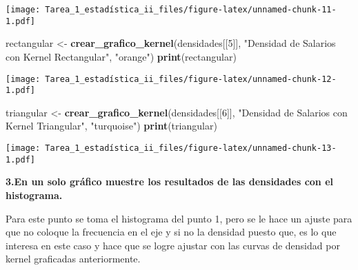 \documentclass[
]{article}
\newenvironment{Shaded}{\begin{snugshade}}{\end{snugshade}}
\newcommand{\DecValTok}[1]{\textcolor[rgb]{0.00,0.00,0.81}{#1}}
\newcommand{\FunctionTok}[1]{\textcolor[rgb]{0.13,0.29,0.53}{\textbf{#1}}}
\newcommand{\NormalTok}[1]{#1}
\newcommand{\OtherTok}[1]{\textcolor[rgb]{0.56,0.35,0.01}{#1}}
\newcommand{\StringTok}[1]{\textcolor[rgb]{0.31,0.60,0.02}{#1}}
\begin{document}
\texttt{[image: Tarea\_1\_estadística\_ii\_files/figure-latex/unnamed-chunk-11-1.pdf]}

\begin{Shaded}
\begin{Highlighting}[]
\NormalTok{rectangular }\OtherTok{\textless{}{-}} \FunctionTok{crear\_grafico\_kernel}\NormalTok{(densidades[[}\DecValTok{5}\NormalTok{]], }
                                    \StringTok{"Densidad de Salarios con Kernel Rectangular"}\NormalTok{, }\StringTok{"orange"}\NormalTok{)}
\FunctionTok{print}\NormalTok{(rectangular)}
\end{Highlighting}
\end{Shaded}

\texttt{[image: Tarea\_1\_estadística\_ii\_files/figure-latex/unnamed-chunk-12-1.pdf]}

\begin{Shaded}
\begin{Highlighting}[]
\NormalTok{triangular }\OtherTok{\textless{}{-}} \FunctionTok{crear\_grafico\_kernel}\NormalTok{(densidades[[}\DecValTok{6}\NormalTok{]], }
                                   \StringTok{"Densidad de Salarios con Kernel Triangular"}\NormalTok{, }\StringTok{"turquoise"}\NormalTok{)}
\FunctionTok{print}\NormalTok{(triangular)}
\end{Highlighting}
\end{Shaded}

\texttt{[image: Tarea\_1\_estadística\_ii\_files/figure-latex/unnamed-chunk-13-1.pdf]}

\textbf{3.En un solo gráfico muestre los resultados de las densidades
con el histograma.}

Para este punto se toma el histograma del punto 1, pero se le hace un
ajuste para que no coloque la frecuencia en el eje y si no la densidad
puesto que, es lo que interesa en este caso y hace que se logre ajustar
con las curvas de densidad por kernel graficadas anteriormente.
\end{document}
